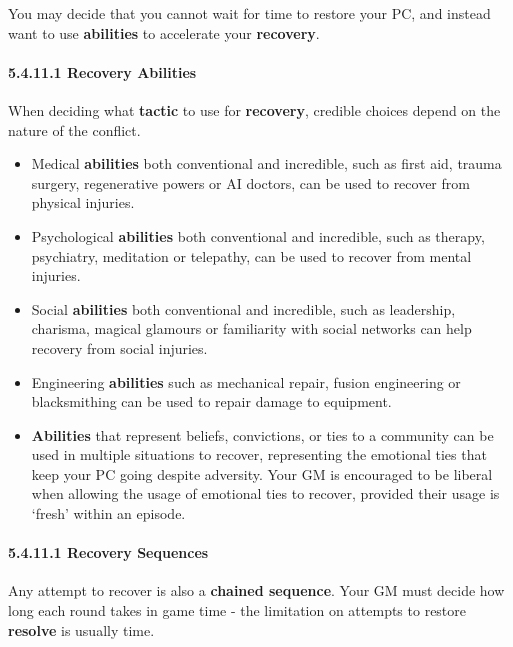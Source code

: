 \documentclass[
  11pt,
]{article}
\providecommand{\tightlist}{%
  \setlength{\itemsep}{0pt}\setlength{\parskip}{0pt}}
\begin{document}
You may decide that you cannot wait for time to restore your PC, and
instead want to use \textbf{abilities} to accelerate your
\textbf{recovery}.

\hypertarget{recovery-abilities-1}{%
\paragraph{5.4.11.1 Recovery Abilities}\label{recovery-abilities-1}}

When deciding what \textbf{tactic} to use for \textbf{recovery},
credible choices depend on the nature of the conflict.

\begin{itemize}
\tightlist
\item
  Medical \textbf{abilities} both conventional and incredible, such as
  first aid, trauma surgery, regenerative powers or AI doctors, can be
  used to recover from physical injuries.
\item
  Psychological \textbf{abilities} both conventional and incredible,
  such as therapy, psychiatry, meditation or telepathy, can be used to
  recover from mental injuries.
\item
  Social \textbf{abilities} both conventional and incredible, such as
  leadership, charisma, magical glamours or familiarity with social
  networks can help recovery from social injuries.
\item
  Engineering \textbf{abilities} such as mechanical repair, fusion
  engineering or blacksmithing can be used to repair damage to
  equipment.
\item
  \textbf{Abilities} that represent beliefs, convictions, or ties to a
  community can be used in multiple situations to recover, representing
  the emotional ties that keep your PC going despite adversity. Your GM
  is encouraged to be liberal when allowing the usage of emotional ties
  to recover, provided their usage is `fresh' within an episode.
\end{itemize}

\hypertarget{recovery-sequences}{%
\paragraph{5.4.11.1 Recovery Sequences}\label{recovery-sequences}}

Any attempt to recover is also a \textbf{chained sequence}. Your GM must
decide how long each round takes in game time - the limitation on
attempts to restore \textbf{resolve} is usually time.
\end{document}
